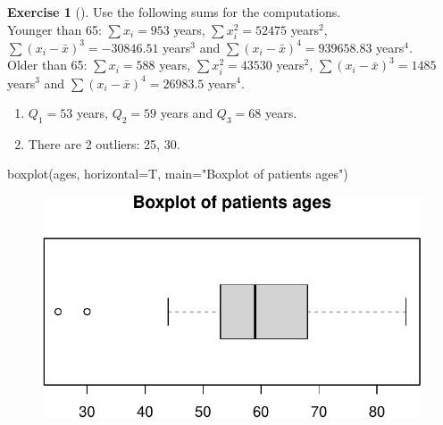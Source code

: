\documentclass[
  a4paper,
]{scrreport}
\newenvironment{Shaded}{\begin{snugshade}}{\end{snugshade}}
\newcommand{\AttributeTok}[1]{\textcolor[rgb]{0.40,0.45,0.13}{#1}}
\newcommand{\FunctionTok}[1]{\textcolor[rgb]{0.28,0.35,0.67}{#1}}
\newcommand{\NormalTok}[1]{\textcolor[rgb]{0.00,0.23,0.31}{#1}}
\newcommand{\StringTok}[1]{\textcolor[rgb]{0.13,0.47,0.30}{#1}}
\providecommand{\tightlist}{%
  \setlength{\itemsep}{0pt}\setlength{\parskip}{0pt}}\usepackage{longtable,booktabs,array}
\theoremstyle{definition}
\newtheorem{exercise}{Exercise}[chapter]
\theoremstyle{remark}
\begin{document}
\begin{exercise}[]
Use the following sums for the computations.\\
Younger than 65: \(\sum x_i=953\) years, \(\sum x_i^2=52475\)
years\(^2\), \(\sum (x_i-\bar x)^3=-30846.51\) years\(^3\) and
\(\sum (x_i-\bar x)^4=939658.83\) years\(^4\).\\
Older than 65: \(\sum x_i=588\) years, \(\sum x_i^2=43530\) years\(^2\),
\(\sum (x_i-\bar x)^3=1485\) years\(^3\) and
\(\sum (x_i-\bar x)^4=26983.5\) years\(^4\).

\end{exercise}

\begin{tcolorbox}[enhanced jigsaw, opacitybacktitle=0.6, breakable, toptitle=1mm, colbacktitle=quarto-callout-tip-color!10!white, colframe=quarto-callout-tip-color-frame, toprule=.15mm, rightrule=.15mm, bottomrule=.15mm, coltitle=black, left=2mm, bottomtitle=1mm, title=\textcolor{quarto-callout-tip-color}{\faLightbulb}\hspace{0.5em}{Solution}, titlerule=0mm, arc=.35mm, opacityback=0, leftrule=.75mm, colback=white]

\begin{enumerate}
\def\labelenumi{\alph{enumi}.}
\tightlist
\item
  \(Q_1=53\) years, \(Q_2=59\) years and \(Q_3=68\) years.
\item
  There are 2 outliers: 25, 30.
\end{enumerate}

\begin{Shaded}
\begin{Highlighting}[]
\FunctionTok{boxplot}\NormalTok{(ages, }\AttributeTok{horizontal=}\NormalTok{T, }\AttributeTok{main=}\StringTok{"Boxplot of patients ages"}\NormalTok{)}
\end{Highlighting}
\end{Shaded}

\begin{figure}[H]

{\centering \includegraphics{img/exam-2018-05-31/boxplot-ages-1.pdf}

}
\end{figure}
\end{tcolorbox}
\end{document}
